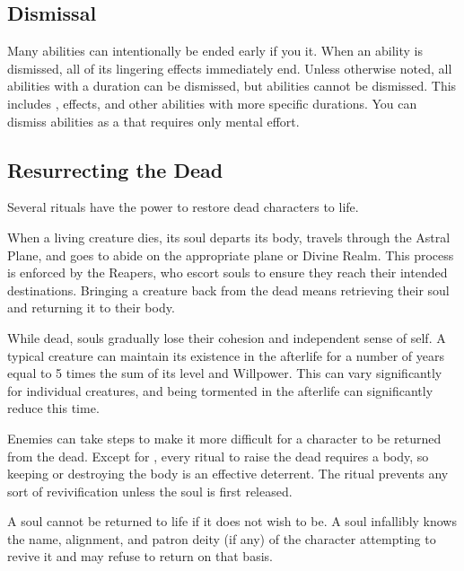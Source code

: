     \subsection{Dismissal}\label{Dismissal}
        Many abilities can intentionally be ended early if you  it.
        When an ability is dismissed, all of its lingering effects immediately end.
        Unless otherwise noted, all \magical abilities with a duration can be dismissed, but  abilities cannot be dismissed.
        This includes ,  effects, and other abilities with more specific durations.
        You can dismiss abilities as a  that requires only mental effort.

    \subsection{Resurrecting the Dead}\label{Resurrecting the Dead}
        Several rituals have the power to restore dead characters to life.

        When a living creature dies, its soul departs its body, travels through the Astral Plane, and goes to abide on the appropriate plane or Divine Realm.
        This process is enforced by the Reapers, who escort souls to ensure they reach their intended destinations.
        Bringing a creature back from the dead means retrieving their soul and returning it to their body.

         While dead, souls gradually lose their cohesion and independent sense of self.
        A typical creature can maintain its existence in the afterlife for a number of years equal to 5 times the sum of its level and Willpower.
        This can vary significantly for individual creatures, and being tormented in the afterlife can significantly reduce this time.

         Enemies can take steps to make it more difficult for a character to be returned from the dead.
        Except for , every ritual to raise the dead requires a body, so keeping or destroying the body is an effective deterrent.
        The  ritual prevents any sort of revivification unless the soul is first released.

         A soul cannot be returned to life if it does not wish to be.
        A soul infallibly knows the name, alignment, and patron deity (if any) of the character attempting to revive it and may refuse to return on that basis.

